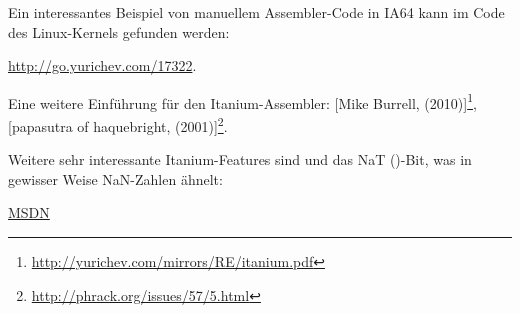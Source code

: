 Ein interessantes Beispiel von manuellem Assembler-Code in \ac{IA64} kann im Code
des Linux-Kernels gefunden werden:

\url{http://go.yurichev.com/17322}.

Eine weitere Einführung für den Itanium-Assembler:
[Mike Burrell,  (2010)]\footnote{\AlsoAvailableAs \url{http://yurichev.com/mirrors/RE/itanium.pdf}},
[papasutra of haquebright,  (2001)]\footnote{\AlsoAvailableAs \url{http://phrack.org/issues/57/5.html}}.

Weitere sehr interessante Itanium-Features sind  und das
NaT ()-Bit, was in gewisser Weise \gls{NaN}-Zahlen ähnelt:

\href{http://go.yurichev.com/17323}{MSDN}
